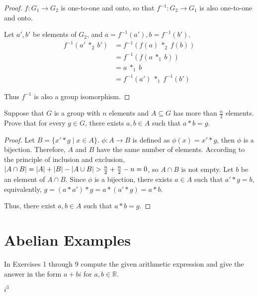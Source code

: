 \begin{proof}
    $f: G_{1} \to G_{2}$ is one-to-one and onto, so that $f^{-1}: G_{2} \to G_{1}$ is also one-to-one and onto.

    Let $a', b'$ be elements of $G_{2}$, and $a = f^{-1}(a'), b = f^{-1}(b')$.
    \begin{align*}
        f^{-1}(a'\ {*}_{2}\ b') & = f^{-1}(f(a)\ {*}_{2}\ f(b))     \\
                                & = f^{-1}(f(a\ {*}_{1}\ b))        \\
                                & = a\ {*}_{1}\ b                   \\
                                & = f^{-1}(a')\ {*}_{1}\ f^{-1}(b')
    \end{align*}

    Thus $f^{-1}$ is also a group isomorphism.
\end{proof}

\begin{exercise}
    Suppose that $G$ is a group with $n$ elements and $A\subseteq G$ has more than $\frac{n}{2}$ elements. Prove that for every $g\in G$, there exists $a, b\in A$ such that $a * b = g$.
\end{exercise}

\begin{proof}
    Let $B = \{ x' * g \mid x\in A \}$. $\phi: A\to B$ is defined as $\phi(x) = x' * g$, then $\phi$ is a bijection. Therefore, $A$ and $B$ have the same number of elements. According to the principle of inclusion and exclusion, $\left\vert{A\cap B}\right\vert = \left\vert{A}\right\vert + \left\vert{B}\right\vert - \left\vert{A\cup B}\right\vert > \frac{n}{2} + \frac{n}{2} - n = 0$, so $A\cap B$ is not empty. Let $b$ be an element of $A\cap B$. Since $\phi$ is a bijection, there exists $a\in A$ such that $a' * g = b$, equivalently, $g = (a * a') * g = a * (a' * g) = a * b$.

    Thus, there exist $a, b\in A$ such that $a * b = g$.
\end{proof}

\section{Abelian Examples}

\setcounter{exercise}{0}

In Exercises 1 through 9 compute the given arithmetic expression and give the answer in the form $a + bi$ for $a, b\in \mathbb{R}$.

\begin{exercise}
    $i^{3}$
\end{exercise}

